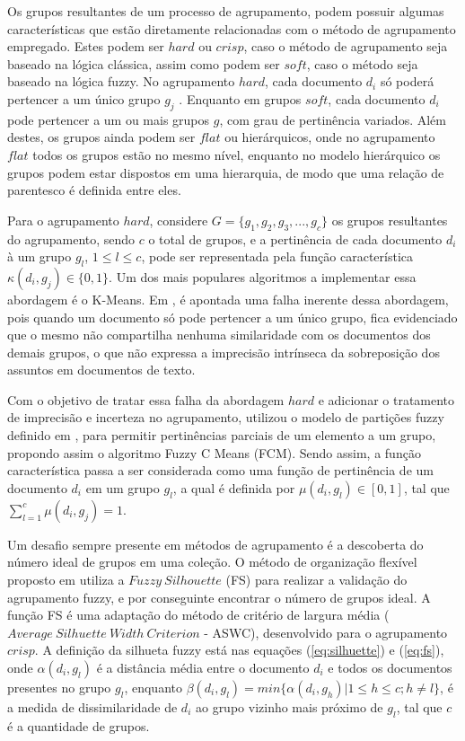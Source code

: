 Os grupos resultantes de um  processo de agrupamento, podem possuir algumas características que estão diretamente
relacionadas com o método de agrupamento empregado. Estes podem ser $hard$ ou $crisp$, caso o método
de agrupamento seja baseado na lógica clássica, assim como podem ser $soft$, caso o método seja
baseado na lógica fuzzy. No agrupamento $hard$, cada documento $d_{i}$ só poderá pertencer a um
único grupo $g_{j}$ \cite{Bezdek1984}. Enquanto em grupos $soft$, cada documento $d_{i}$ pode
pertencer a um ou mais grupos $g$, com grau de pertinência variados.  Além destes, os grupos
ainda podem ser $flat$ ou hierárquicos, onde no agrupamento $flat$ todos os grupos estão no mesmo
nível, enquanto no modelo hierárquico os grupos podem estar dispostos em uma hierarquia, de modo que
uma relação de parentesco é definida entre eles.

Para o agrupamento $hard$, considere $G = \{g_{1},g_{2},g_{3},...,g_{c}\}$ os grupos resultantes do agrupamento, sendo $c$
o total de grupos, e a pertinência de cada documento $d_{i}$ à um grupo $g_{l}$, $1 \leq l \leq c$, pode ser representada pela função característica $\kappa(d_{i}, g_{j}) \in \{0,1\}$.  Um dos mais populares algoritmos a implementar essa abordagem é o K-Means.  Em \cite{Bezdek1984}\cite{Nogueira2013}\cite{Feldman2007}, é apontada uma falha inerente
dessa abordagem, pois quando um documento só pode pertencer a um único grupo, fica evidenciado que o
mesmo não compartilha nenhuma similaridade com os documentos dos demais grupos, o que não expressa a
imprecisão intrínseca da sobreposição dos assuntos em documentos de texto.

Com o objetivo de tratar essa falha da abordagem $hard$ e adicionar o tratamento de imprecisão e
incerteza no agrupamento, \cite{Bezdek1984} utilizou o modelo de partições fuzzy definido em
\cite{Zadeh1965}, para permitir pertinências parciais de um elemento a um grupo, propondo assim o
algoritmo Fuzzy C Means (FCM).  Sendo assim, a função característica passa a ser considerada como uma função de pertinência de um documento $d_{i}$ em um grupo $g_{l}$, a qual é definida por $\mu(d_{i}, g_{l}) \in [0,1]$, tal que $\sum_{l=1}^c
\mu(d_{i}, g_{j}) = 1$.

Um desafio sempre presente em métodos de agrupamento é a descoberta do número ideal de grupos em
uma coleção. O método de organização flexível proposto em \cite{Nogueira2013} utiliza a  $Fuzzy\
Silhouette$ (FS) para realizar a validação do agrupamento fuzzy, e por conseguinte encontrar o
número de grupos ideal. A função FS é uma adaptação do método de critério de largura média
($Average\ Silhuette\ Width\ Criterion$ - ASWC), desenvolvido para o agrupamento $crisp$. A definição da silhueta fuzzy está nas equações (\ref{eq:silhuette}) e
(\ref{eq:fs}), onde $\alpha(d_i, g_l)$ é a distância média entre o documento $d_i$ e todos os
documentos presentes no grupo $g_l$, enquanto $\beta(d_i,g_l) = min\{\alpha(d_i,g_h) | 1 \leq h \leq
c; h \neq l\}$, é a medida de dissimilaridade de $d_i$ ao grupo vizinho mais próximo de $g_l$, tal
que $c$ é a quantidade de grupos.  



